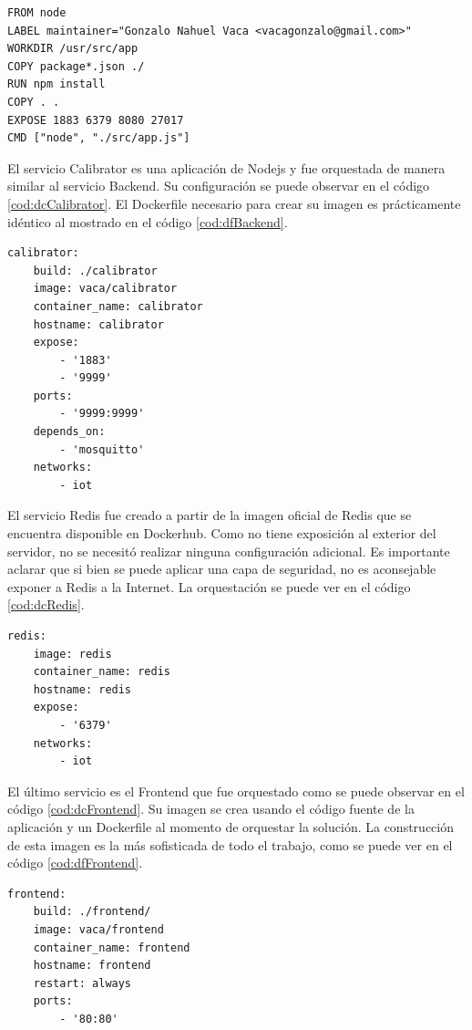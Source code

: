 \begin{lstlisting}[label=cod:dfBackend,caption=Dockerfile del servicio Backend.]
FROM node
LABEL maintainer="Gonzalo Nahuel Vaca <vacagonzalo@gmail.com>"
WORKDIR /usr/src/app
COPY package*.json ./
RUN npm install
COPY . .
EXPOSE 1883 6379 8080 27017
CMD ["node", "./src/app.js"]
\end{lstlisting}

El servicio Calibrator es una aplicación de Nodejs y fue orquestada de manera similar al servicio Backend.
Su configuración se puede observar en el código \ref{cod:dcCalibrator}.
El Dockerfile necesario para crear su imagen es prácticamente idéntico al mostrado en el código \ref{cod:dfBackend}.

\begin{lstlisting}[label=cod:dcCalibrator,caption=Orquestación del servicio Calibrator.]
calibrator:
	build: ./calibrator
	image: vaca/calibrator
	container_name: calibrator
	hostname: calibrator
	expose: 
		- '1883'
		- '9999'
	ports:
		- '9999:9999'
	depends_on: 
		- 'mosquitto'
	networks: 
		- iot
\end{lstlisting}

El servicio Redis fue creado a partir de la imagen oficial de Redis que se encuentra disponible en Dockerhub. \citep{contrib:redis}
Como no tiene exposición al exterior del servidor, no se necesitó realizar ninguna configuración adicional.
Es importante aclarar que si bien se puede aplicar una capa de seguridad, no es aconsejable exponer a Redis a la Internet.
La orquestación se puede ver en el código \ref{cod:dcRedis}.

\begin{lstlisting}[label=cod:dcRedis,caption=Orquestación del servicio Redis.]
redis:
	image: redis
	container_name: redis
	hostname: redis
	expose:
		- '6379'
	networks: 
		- iot
\end{lstlisting}

El último servicio es el Frontend que fue orquestado como se puede observar en el código \ref{cod:dcFrontend}.
Su imagen se crea usando el código fuente de la aplicación y un Dockerfile al momento de orquestar la solución.
La construcción de esta imagen es la más sofisticada de todo el trabajo, como se puede ver en el código \ref{cod:dfFrontend}.

\begin{lstlisting}[label=cod:dcFrontend,caption=Orquestación del servicio Frontend.]
frontend:
	build: ./frontend/
	image: vaca/frontend
	container_name: frontend
	hostname: frontend
	restart: always
	ports: 
		- '80:80'
\end{lstlisting}

